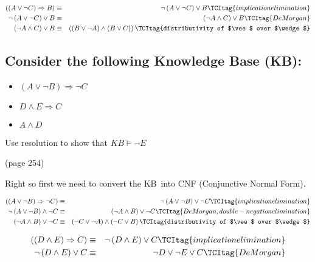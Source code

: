 \documentclass{article}
\begin{document}
\begin{eqnarray}
\left( \left( A\vee \lnot C\right) \Rightarrow B\right) &\equiv &\lnot
\left( A\vee \lnot C\right) \vee B  \TCItag{implication elimination} \\
\lnot \left( A\vee \lnot C\right) \vee B &\equiv &\left( \lnot A\wedge
C\right) \vee B  \TCItag{De Morgan} \\
\left( \lnot A\wedge C\right) \vee B &\equiv &\left( \left( B\vee \lnot
A\right) \wedge \left( B\vee C\right) \right)  \TCItag{distributivity
of
$\vee $ over $\wedge $}
\end{eqnarray}

\subsection{Consider the following Knowledge Base (KB):}

\begin{itemize}
\item $\left( A\vee \lnot B\right) \Rightarrow \lnot C$

\item $D\wedge E\Rightarrow C$

\item $A\wedge D$
\end{itemize}

Use resolution to show that $KB\models \lnot E$

(page 254)

Right so first we need to convert the KB\ into CNF (Conjunctive Normal Form).

\begin{eqnarray}
\left( \left( A\vee \lnot B\right) \Rightarrow \lnot C\right)  &\equiv
&\lnot \left( A\vee \lnot B\right) \vee \lnot C  \TCItag{implication
elimination} \\
\lnot \left( A\vee \lnot B\right) \wedge \lnot C &\equiv &\left( \lnot
A\wedge B\right) \vee \lnot C  \TCItag{De Morgan, double-negation
elimination} \\
\left( \lnot A\wedge B\right) \vee \lnot C &\equiv &\left( \lnot C\vee \lnot
A\right) \wedge \left( \lnot C\vee B\right)   \TCItag{distributivity of
$\vee $ over $\wedge $}
\end{eqnarray}

\bigskip 

\begin{eqnarray}
\left( \left( D\wedge E\right) \Rightarrow C\right)  &\equiv &\lnot \left(
D\wedge E\right) \vee C  \TCItag{implication elimination} \\
\lnot \left( D\wedge E\right) \vee C &\equiv &\lnot D\vee \lnot E\vee C 
\TCItag{De Morgan}
\end{eqnarray}
\end{document}
